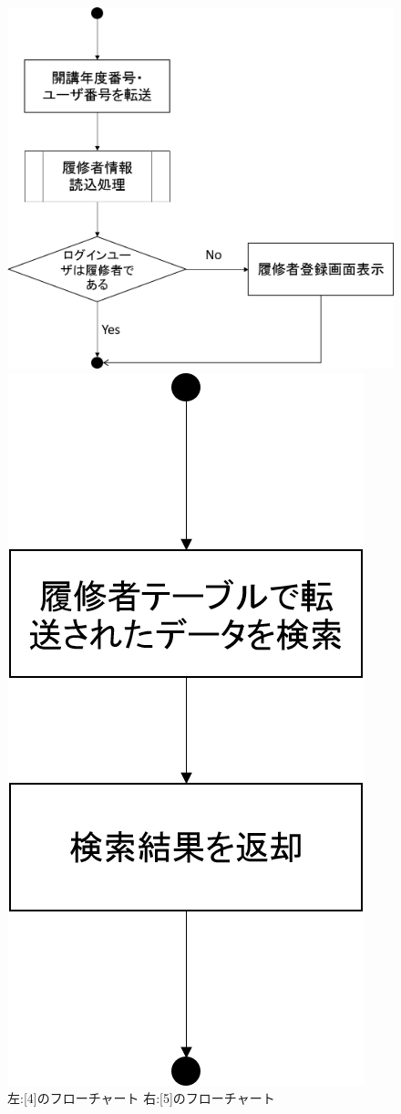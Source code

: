 \begin{figure}[htbp]
 \begin{minipage}{0.5\hsize}
  \begin{center}
   \includegraphics[width=1\linewidth,clip]{./img/login/sub4.png}
  \end{center}
 \end{minipage}
 \begin{minipage}{0.5\hsize}
  \begin{center}
   \includegraphics[width=0.5\linewidth,clip]{./img/login/sub5.png}
  \end{center}
 \end{minipage}
 \caption{左:[4]のフローチャート 右:[5]のフローチャート}\label{fig:loginflow2}
\end{figure}


